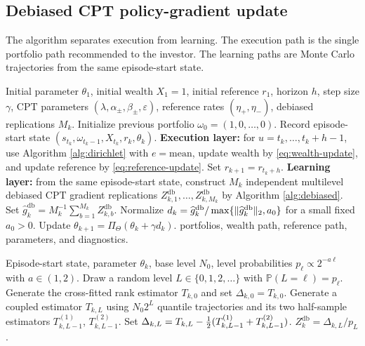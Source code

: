 \documentclass[11pt]{article}
\newcommand{\Pp}{\mathbb P}
\newcommand{\1}{\mathbf 1}
\DeclarePairedDelimiter{\norm}{\lVert}{\rVert}
\newcommand{\ThetaSet}{\Theta}
\newcommand{\CPT}{\ensuremath{\mathrm{CPT}}\xspace}
\newcommand{\DRCPTPG}{\ensuremath{\mathrm{DRCPT\mbox{-}PG}}\xspace}
\newcommand{\eps}{\varepsilon}
\newcommand{\etaP}{\eta_{+}}
\newcommand{\etaM}{\eta_{-}}
\newcommand{\db}{\mathrm{db}}
\begin{document}
\subsection{Debiased CPT policy-gradient update}

The algorithm separates execution from learning.  The execution path is the single portfolio path recommended to the investor.  The learning paths are Monte Carlo trajectories from the same episode-start state.

\begin{algorithm}[t]
\caption{Dynamic-reference \CPT policy gradient (\DRCPTPG)}\label{alg:drcptpg}
\begin{algorithmic}[1]
\Require Initial parameter $\theta_1$, initial wealth $X_1=1$, initial reference $r_1$, horizon $h$, step size $\gamma$, \CPT parameters $(\lambda,\alpha_\pm,\beta_\pm,\eps)$, reference rates $(\etaP,\etaM)$, debiased replications $M_k$.
\State Initialize previous portfolio $\omega_0=(1,0,\ldots,0)$.
    \State Record episode-start state $(s_{t_k},\omega_{t_k-1},X_{t_k},r_k,\theta_k)$.
    \State \textbf{Execution layer:} for $u=t_k,\ldots,t_k+h-1$, use Algorithm \ref{alg:dirichlet} with $e=\mathrm{mean}$, update wealth by \eqref{eq:wealth-update}, and update reference by \eqref{eq:reference-update}.
    \State Set $r_{k+1}=r_{t_k+h}$.
    \State \textbf{Learning layer:} from the same episode-start state, construct $M_k$ independent multilevel debiased \CPT gradient replications $Z_{k,1}^{\db},\ldots,Z_{k,M_k}^{\db}$ by Algorithm \ref{alg:debiased}.
    \State Set $\widehat g_k^{\db}=M_k^{-1}\sum_{b=1}^{M_k} Z_{k,b}^{\db}$.
    \State Normalize $d_k=\widehat g_k^{\db}/\max\{\norm{\widehat g_k^{\db}}_2,a_0\}$ for a small fixed $a_0>0$.
    \State Update $\theta_{k+1}=\Pi_{\ThetaSet}(\theta_k+\gamma d_k)$.
\EndFor
\State \Return portfolios, wealth path, reference path, parameters, and diagnostics.
\end{algorithmic}
\end{algorithm}

\begin{algorithm}[t]
\caption{One multilevel debiased \CPT gradient replication}\label{alg:debiased}
\begin{algorithmic}[1]
\Require Episode-start state, parameter $\theta_k$, base level $N_0$, level probabilities $p_\ell\propto2^{-a\ell}$ with $a\in(1,2)$.
\State Draw a random level $L\in\{0,1,2,\ldots\}$ with $\Pp(L=\ell)=p_\ell$.
    \State Generate the cross-fitted rank estimator $T_{k,0}$ and set $\Delta_{k,0}=T_{k,0}$.
\Else
    \State Generate a coupled estimator $T_{k,L}$ using $N_0 2^L$ quantile trajectories and its two half-sample estimators $T_{k,L-1}^{(1)}$, $T_{k,L-1}^{(2)}$.
    \State Set $\Delta_{k,L}=T_{k,L}-{1\over2}(T_{k,L-1}^{(1)}+T_{k,L-1}^{(2)})$.
\EndIf
\State \Return $Z_{k}^{\db}=\Delta_{k,L}/p_L$.
\end{algorithmic}
\end{algorithm}
\end{document}
